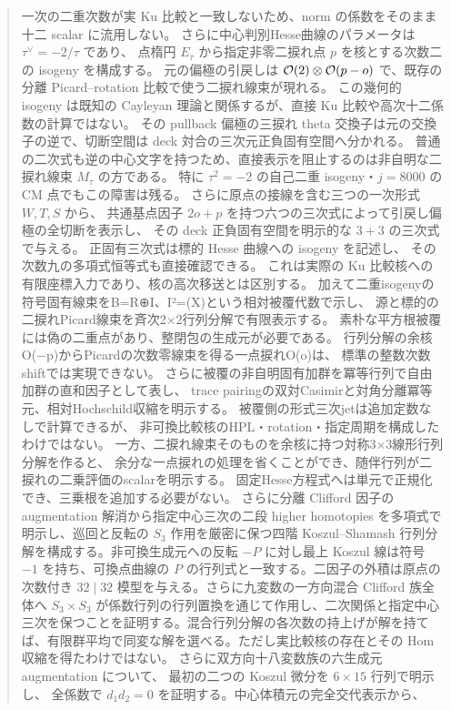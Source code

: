 \begin{abstract}
一次の二重次数が実 Ku 比較と一致しないため、norm の係数をそのまま十二 scalar に流用しない。
さらに中心判別Hesse曲線のパラメータは $\tau^\vee=-2/\tau$ であり、
点楕円 $E_\tau$ から指定非零二捩れ点 $p$ を核とする次数二の isogeny を構成する。
元の偏極の引戻しは $\OO(2)\otimes\OO(p-o)$ で、既存の分離 Picard--rotation 比較で使う二捩れ線束が現れる。
この幾何的 isogeny は既知の Cayleyan 理論と関係するが、直接 Ku 比較や高次十二係数の計算ではない。
その pullback 偏極の三捩れ theta 交換子は元の交換子の逆で、切断空間は deck 対合の三次元正負固有空間へ分かれる。
普通の二次式も逆の中心文字を持つため、直接表示を阻止するのは非自明な二捩れ線束 $M_\tau$ の方である。
特に $\tau^2=-2$ の自己二重 isogeny・$j=8000$ の CM 点でもこの障害は残る。
さらに原点の接線を含む三つの一次形式 $W,T,S$ から、
共通基点因子 $2o+p$ を持つ六つの三次式によって引戻し偏極の全切断を表示し、
その deck 正負固有空間を明示的な $3+3$ の三次式で与える。
正固有三次式は標的 Hesse 曲線への isogeny を記述し、
その次数九の多項式恒等式も直接確認できる。
これは実際の Ku 比較核への有限座標入力であり、核の高次移送とは区別する。
加えて二重isogenyの符号固有線束をB=R⊕I、I²=(X)という相対被覆代数で示し、
源と標的の二捩れPicard線束を斉次2×2行列分解で有限表示する。
素朴な平方根被覆には偽の二重点があり、整閉包の生成元が必要である。
行列分解の余核O(−p)からPicardの次数零線束を得る一点捩れO(o)は、
標準の整数次数shiftでは実現できない。
さらに被覆の非自明固有加群を冪等行列で自由加群の直和因子として表し、
trace pairingの双対Casimirと対角分離冪等元、相対Hochschild収縮を明示する。
被覆側の形式三次jetは追加定数なしで計算できるが、
非可換比較核のHPL・rotation・指定周期を構成したわけではない。
一方、二捩れ線束そのものを余核に持つ対称3×3線形行列分解を作ると、
余分な一点捩れの処理を省くことができ、随伴行列が二捩れの二乗評価のscalarを明示する。
固定Hesse方程式へは単元で正規化でき、三乗根を追加する必要がない。
さらに分離 Clifford 因子の augmentation 解消から指定中心三次の二段 higher homotopies を多項式で明示し、巡回と反転の $S_3$ 作用を厳密に保つ四階 Koszul--Shamash 行列分解を構成する。非可換生成元への反転 $-P$ に対し最上 Koszul 線は符号 $-1$ を持ち、可換点曲線の $P$ の行列式と一致する。二因子の外積は原点の次数付き $32\mid32$ 模型を与える。さらに九変数の一方向混合 Clifford 族全体へ $S_3\times S_3$ が係数行列の行列置換を通じて作用し、二次関係と指定中心三次を保つことを証明する。混合行列分解の各次数の持上げが解を持てば、有限群平均で同変な解を選べる。ただし実比較核の存在とその Hom 収縮を得たわけではない。
さらに双方向十八変数族の六生成元 augmentation について、
最初の二つの Koszul 微分を $6\times15$ 行列で明示し、
全係数で $d_1d_2=0$ を証明する。中心体積元の完全交代表示から、

\end{abstract}
